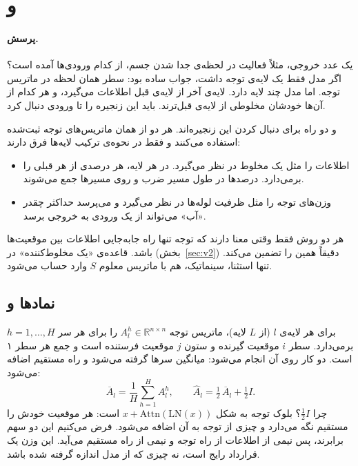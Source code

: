 \FloatBarrier
\section{ و }
\label{sec:rollout-flow}

\paragraph{پرسش.} یک عدد خروجی، مثلاً فعالیت  در لحظه‌ی جدا شدن جسم، از کدام ورودی‌ها آمده است؟ اگر مدل فقط یک لایه‌ی توجه داشت، جواب ساده بود: سطر همان لحظه در ماتریس توجه. اما مدل چند لایه دارد. لایه‌ی آخر از  لایه‌ی قبل اطلاعات می‌گیرد، و هر کدام از آن‌ها خودشان مخلوطی از  لایه‌ی قبل‌ترند. باید این زنجیره را تا ورودی دنبال کرد.

 و  \cite{abnar2020} دو راه برای دنبال کردن این زنجیره‌اند. هر دو از همان ماتریس‌های توجه ثبت‌شده استفاده می‌کنند و فقط در نحوه‌ی ترکیب لایه‌ها فرق دارند:
\begin{itemize}
\item \textbf{} اطلاعات را مثل یک مخلوط در نظر می‌گیرد. در هر لایه، هر  درصدی از هر  قبلی را برمی‌دارد. درصدها در طول مسیر ضرب و روی مسیرها جمع می‌شوند.
\item \textbf{} وزن‌های توجه را مثل ظرفیت لوله‌ها در نظر می‌گیرد و می‌پرسد حداکثر چقدر «آب» می‌تواند از یک ورودی به خروجی برسد.
\end{itemize}

هر دو روش فقط وقتی معنا دارند که توجه تنها راه جابه‌جایی اطلاعات بین موقعیت‌ها باشد. قاعده‌ی «یک مخلوط‌کننده» در  (بخش~\ref{sec:v2}) دقیقاً همین را تضمین می‌کند. تنها استثنا،  سینماتیک، هم با ماتریس معلوم $S$ وارد حساب می‌شود.

\subsection{نمادها و }

برای هر لایه‌ی $l$ (از $L$ لایه)،  ماتریس توجه $A^{h}_l\in\mathbb{R}^{n\times n}$ را برای هر سر $h=1,\dots,H$ برمی‌دارد. سطر $i$ موقعیت گیرنده و ستون $j$ موقعیت فرستنده است و جمع هر سطر ۱ است. دو کار روی آن انجام می‌شود: میانگین سرها گرفته می‌شود و راه مستقیم  اضافه می‌شود:
\begin{equation}
\overline{A}_l=\frac1H\sum_{h=1}^{H}A^{h}_l,\qquad \hat A_l=\tfrac12\,\overline{A}_l+\tfrac12 I .
\label{eq:ahat}
\end{equation}
چرا $\tfrac12 I$؟ بلوک توجه به شکل $x+\mathrm{Attn}(\mathrm{LN}(x))$ است: هر موقعیت خودش را مستقیم نگه می‌دارد و چیزی از توجه به آن اضافه می‌شود. فرض می‌کنیم این دو سهم برابرند، پس نیمی از اطلاعات از راه توجه و نیمی از راه مستقیم می‌آید. این وزن  یک قرارداد رایج است، نه چیزی که از مدل اندازه گرفته شده باشد.

